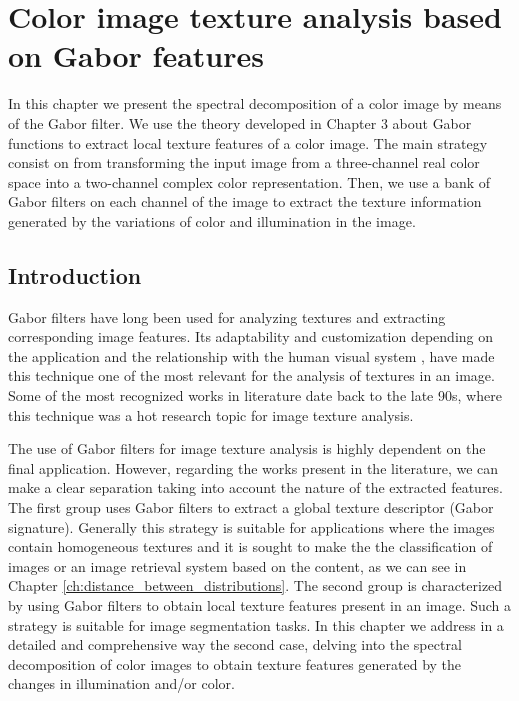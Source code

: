 \chapter{Color image texture analysis based on Gabor features}


In this chapter we present the spectral decomposition of a color image by means of the Gabor filter. We use the theory developed in Chapter 3 about Gabor functions to extract local texture features of a color image. The main strategy consist on from transforming the input image from a three-channel real color space into a two-channel complex color representation. Then, we use a bank of Gabor filters on each channel of the image to extract the texture information generated by the variations of color and illumination in the image.

\section{Introduction}

Gabor filters have long been used for analyzing textures and extracting corresponding image features. Its adaptability and customization depending on the application and the relationship with the human visual system \cite{Daugman:JOSA:1985a}, have made this technique one of the most relevant for the analysis of textures in an image.
Some of the most recognized works in literature date back to the late 90s, where this technique was a hot research topic for image texture analysis.

The use of Gabor filters for image texture analysis is highly dependent on the final application. However, regarding the works present in the literature, we can make a clear separation taking into account the nature of the extracted features. The first group uses Gabor filters to extract a global texture descriptor (Gabor signature). Generally this strategy is suitable for applications where the images contain homogeneous textures and it is sought to make the the classification of images or an image retrieval system based on the content, as we can see in Chapter \ref{ch:distance_between_distributions}. The second group is characterized by using Gabor filters to obtain local texture features present in an image. Such a strategy is suitable for image segmentation tasks. In this chapter we address in a detailed and comprehensive way the second case, delving into the spectral decomposition of color images to obtain texture features generated by the changes in illumination and/or color.

